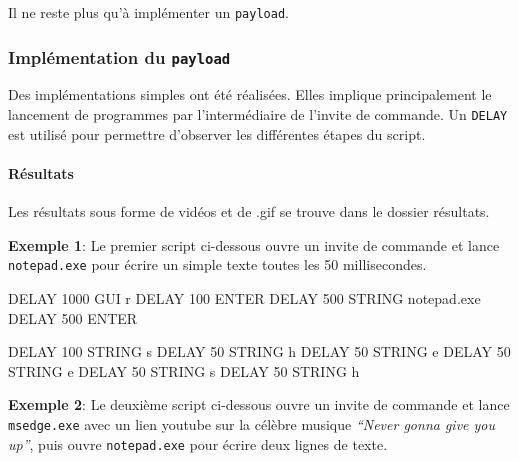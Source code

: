 \documentclass[
  french,
  paper=a4,
  ,captions=tableheading
]{scrartcl}
\newenvironment{Shaded}{\begin{snugshade}}{\end{snugshade}}
\newcommand{\DataTypeTok}[1]{\textcolor[rgb]{0.13,0.29,0.53}{#1}}
\newcommand{\FunctionTok}[1]{\textcolor[rgb]{0.00,0.00,0.00}{#1}}
\newcommand{\NormalTok}[1]{#1}
\begin{document}
Il ne reste plus qu'à implémenter un \texttt{payload}.

\hypertarget{impluxe9mentation-du-payload}{%
\subsubsection{\texorpdfstring{Implémentation du
\texttt{payload}}{Implémentation du payload}}\label{impluxe9mentation-du-payload}}

Des implémentations simples ont été réalisées. Elles implique
principalement le lancement de programmes par l'intermédiaire de
l'invite de commande. Un \texttt{DELAY} est utilisé pour permettre
d'observer les différentes étapes du script.

\hypertarget{ruxe9sultats}{%
\paragraph{Résultats}\label{ruxe9sultats}}

Les résultats sous forme de vidéos et de .gif se trouve dans le dossier résultats.

\textbf{Exemple 1}: Le premier script ci-dessous ouvre un invite de
commande et lance \texttt{notepad.exe} pour écrire un simple texte
toutes les 50 millisecondes.

\begin{Shaded}
\begin{Highlighting}[]
\NormalTok{DELAY 1000}
\NormalTok{GUI }\FunctionTok{r}
\NormalTok{DELAY 100}
\NormalTok{ENTER}
\NormalTok{DELAY 500}
\DataTypeTok{STRING}\NormalTok{ notepad.}\FunctionTok{exe}
\NormalTok{DELAY 500}
\NormalTok{ENTER}

\NormalTok{DELAY 100}
\DataTypeTok{STRING}\NormalTok{ s}
\NormalTok{DELAY 50}
\DataTypeTok{STRING} \FunctionTok{h}
\NormalTok{DELAY 50}
\DataTypeTok{STRING}\NormalTok{ e}
\NormalTok{DELAY 50}
\DataTypeTok{STRING}\NormalTok{ e}
\NormalTok{DELAY 50}
\DataTypeTok{STRING}\NormalTok{ s}
\NormalTok{DELAY 50}
\DataTypeTok{STRING} \FunctionTok{h}
\end{Highlighting}
\end{Shaded}

\textbf{Exemple 2}: Le deuxième script ci-dessous ouvre un invite de
commande et lance \texttt{msedge.exe} avec un lien youtube sur la
célèbre musique \emph{``Never gonna give you up''}, puis ouvre
\texttt{notepad.exe} pour écrire deux lignes de texte.
\end{document}
